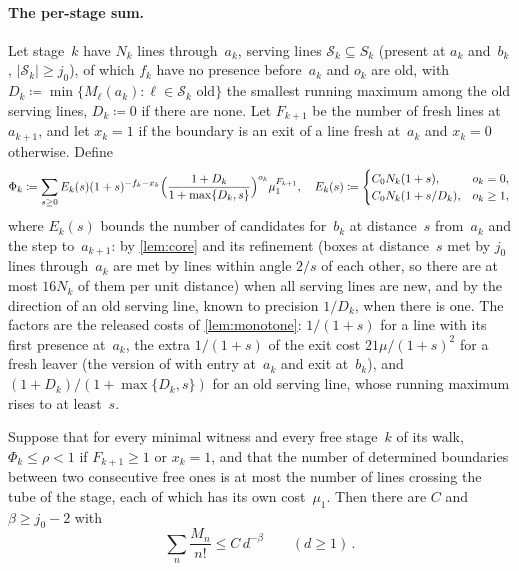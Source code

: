 \documentclass[11pt,letterpaper]{article}
\begin{document}
\paragraph{The per-stage sum.} Let stage~$k$ have $N_k$ lines through~$a_k$, serving lines $\mathcal S_k\subseteq S_k$ (present at $a_k$ and~$b_k$, $\lvert\mathcal S_k\rvert\ge j_0$), of which $f_k$ have no presence before~$a_k$ and $o_k$ are old, with $D_k\coloneqq\min\{M_\ell(a_k)\colon\ell\in\mathcal S_k\text{ old}\}$ the smallest running maximum among the old serving lines, $D_k\coloneqq0$ if there are none. Let $F_{k+1}$ be the number of fresh lines at $a_{k+1}$, and let $x_k=1$ if the boundary is an exit of a line fresh at~$a_k$ and $x_k=0$ otherwise. Define
\begin{equation}
\label{eq:phi}
  \Phi_k\coloneqq\sum_{s\ge0}E_k(s)(1+s)^{-f_k-x_k}\Bigl(\frac{1+D_k}{1+\max\{D_k,s\}}\Bigr)^{o_k}\mu_1^{F_{k+1}},\quad
  E_k(s)\coloneqq\begin{cases}C_0N_k(1+s),&o_k=0,\\ C_0N_k(1+s/D_k),&o_k\ge1,\end{cases}
\end{equation}
where $E_k(s)$ bounds the number of candidates for~$b_k$ at distance~$s$ from~$a_k$ and the step to~$a_{k+1}$: by \cref{lem:core} and its refinement (boxes at distance~$s$ met by $j_0$ lines through~$a_k$ are met by lines within angle $2/s$ of each other, so there are at most $16N_k$ of them per unit distance) when all serving lines are new, and by the direction of an old serving line, known to precision $1/D_k$, when there is one. The factors are the released costs of \cref{lem:monotone}: $1/(1+s)$ for a line with its first presence at~$a_k$, the extra $1/(1+s)$ of the exit cost $21\mu/(1+s)^2$ for a fresh leaver (the version of \cite[Lemma~7.2]{DEC26} with entry at~$a_k$ and exit at~$b_k$), and $(1+D_k)/(1+\max\{D_k,s\})$ for an old serving line, whose running maximum rises to at least~$s$.

\begin{theorem}[Summation]
\label{thm:sum}
Suppose that for every minimal witness and every free stage~$k$ of its walk, $\Phi_k\le\rho<1$ if $F_{k+1}\ge1$ or $x_k=1$, and that the number of determined boundaries between two consecutive free ones is at most the number of lines crossing the tube of the stage, each of which has its own cost~$\mu_1$. Then there are $C$ and $\beta\ge j_0-2$ with
\begin{equation}
\label{eq:final}
  \sum_{n}\frac{M_n}{n!}\le C\,d^{-\beta}\qquad(d\ge1)\,.
\end{equation}
\end{theorem}
\end{document}
